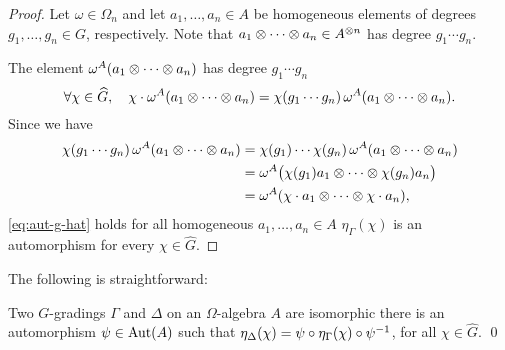 \begin{proof}
    Let $\omega \in \Omega_n$ and let $a_1, \ldots, a_n \in A$ be homogeneous elements of degrees $g_1, \ldots, g_n \in G$, respectively. 
    Note that $a_1\otimes \cdots \otimes a_n \in A^{\otimes n}$ has degree $g_1 \cdots g_n$. 
    

    The element $\omega^A (a_1\otimes \cdots \otimes a_n)$ has degree $g_1 \cdots g_n$ \IFF 
    \[\label{eq:aut-g-hat}
        \forall \chi \in \widehat G, \quad
        \chi \cdot \omega^A (a_1\otimes \cdots \otimes a_n) 
		= \chi(g_1 \cdots g_n) \, \omega^A(a_1\otimes \cdots \otimes a_n).
    \]
	Since we have
	\begin{align*}
		\chi(g_1 \cdots g_n) \, \omega^A(a_1\otimes \cdots \otimes a_n) 
		& =\chi(g_1) \cdots \chi(g_n) \, \omega^A(a_1\otimes \cdots \otimes a_n) \\
		& = \omega^A \big(\chi(g_1)a_1\otimes \cdots \otimes \chi(g_n)a_n \big) \\
		& = \omega^A(\chi \cdot a_1 \otimes \cdots \otimes  \chi \cdot a_n),
	\end{align*}
%	
	\cref{eq:aut-g-hat} holds for all homogeneous $a_1, \ldots, a_n \in A$ \IFF $\eta_\Gamma (\chi)$ is an automorphism for every $\chi \in \widehat G$.  
\end{proof}


The following is straightforward:

\begin{prop}\label{prop:iso-g-hat-action}
    Two $G$-gradings $\Gamma$ and $\Delta$ on an $\Omega$-algebra $A$ are isomorphic \IFF there is an automorphism $\psi \in \operatorname{Aut}(A)$ such that $\eta_\Delta(\chi) = \psi \circ \eta_\Gamma(\chi) \circ \psi^{-1}$, for all $\chi \in \widehat G$. \qed
\end{prop}

    
    
    


